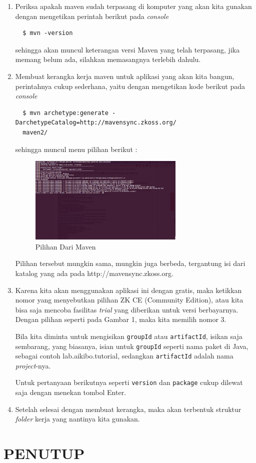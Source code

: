 \documentclass[pdftex, 12pt, oneside]{article}
\begin{document}
\begin{enumerate}
  \item Periksa apakah maven sudah terpasang di komputer yang akan kita gunakan dengan mengetikan perintah berikut pada \textit{console}
  
  \begin{verbatim}
  $ mvn -version
  \end{verbatim}
  
sehingga akan muncul keterangan versi Maven yang telah terpasang, jika memang belum ada, silahkan memasangnya terlebih dahulu.

  \item Membuat kerangka kerja maven untuk aplikasi yang akan kita bangun, perintahnya cukup sederhana, yaitu dengan mengetikan kode berikut pada \textit{console}
  
  \begin{verbatim}
  $ mvn archetype:generate -DarchetypeCatalog=http://mavensync.zkoss.org/
  maven2/
  \end{verbatim}
  
sehingga muncul menu pilihan berikut :

\begin{figure}[H]
  \centering
  \includegraphics[width=0.7\textwidth]{./resources/pilihan-mvn-generate}
  \caption{Pilihan Dari Maven}
\end{figure}

Pilihan tersebut mungkin sama, mungkin juga berbeda, tergantung isi dari katalog yang ada pada http://mavensync.zkoss.org.

  \item Karena kita akan menggunakan aplikasi ini dengan gratis, maka ketikkan nomor yang menyebutkan pilihan ZK CE (Community Edition), atau kita bisa saja mencoba fasilitas \textit{trial} yang diberikan untuk versi berbayarnya. Dengan pilihan seperti pada Gambar 1, maka kita memilih nomor 3.
  
  Bila kita diminta untuk mengisikan \verb|groupId| atau \verb|artifactId|, isikan saja sembarang, yang biasanya, isian untuk \verb|groupId| seperti nama paket di Java, sebagai contoh lab.aikibo.tutorial, sedangkan \verb|artifactId| adalah nama \textit{project}-nya.
  
  Untuk pertanyaan berikutnya seperti \verb|version| dan \verb|package| cukup dilewat saja dengan menekan tombol Enter.
  
  \item Setelah selesai dengan membuat kerangka, maka akan terbentuk struktur \textit{folder} kerja yang nantinya kita gunakan.

\end{enumerate}

\section{PENUTUP}
\end{document}

